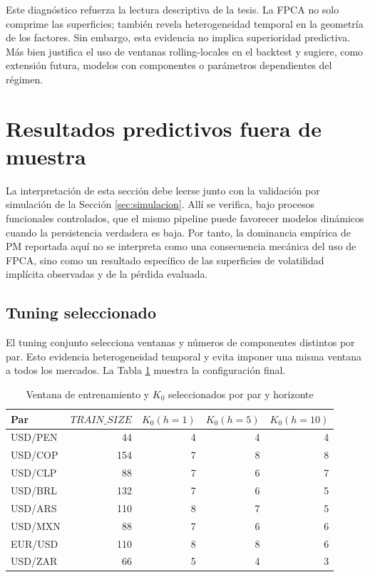\documentclass[a4paper,11pt]{article}
\newcommand{\SVIs}{superficies de volatilidad implícita}
\begin{document}
Este diagnóstico refuerza la lectura descriptiva de la tesis. La FPCA no solo comprime las superficies; también revela heterogeneidad temporal en la geometría de los factores. Sin embargo, esta evidencia no implica superioridad predictiva. Más bien justifica el uso de ventanas rolling-locales en el backtest y sugiere, como extensión futura, modelos con componentes o parámetros dependientes del régimen.

\section{Resultados predictivos fuera de muestra}

La interpretación de esta sección debe leerse junto con la validación por simulación de la Sección \ref{sec:simulacion}. Allí se verifica, bajo procesos funcionales controlados, que el mismo pipeline puede favorecer modelos dinámicos cuando la persistencia verdadera es baja. Por tanto, la dominancia empírica de PM reportada aquí no se interpreta como una consecuencia mecánica del uso de FPCA, sino como un resultado específico de las \SVIs{} observadas y de la pérdida evaluada.

\subsection{Tuning seleccionado}

El tuning conjunto selecciona ventanas y números de componentes distintos por par. Esto evidencia heterogeneidad temporal y evita imponer una misma ventana a todos los mercados. La Tabla \ref{tab:tuning} muestra la configuración final.

\begin{table}[H]
\centering
\caption{Ventana de entrenamiento y \(K_0\) seleccionados por par y horizonte}
\label{tab:tuning}
\small
\begin{tabular}{lrrrr}
\toprule
Par & \(TRAIN\_SIZE\) & \(K_0(h=1)\) & \(K_0(h=5)\) & \(K_0(h=10)\) \\
\midrule
USD/PEN & 44 & 4 & 4 & 4 \\
USD/COP & 154 & 7 & 8 & 8 \\
USD/CLP & 88 & 7 & 6 & 7 \\
USD/BRL & 132 & 7 & 6 & 5 \\
USD/ARS & 110 & 8 & 7 & 5 \\
USD/MXN & 88 & 7 & 6 & 6 \\
EUR/USD & 110 & 8 & 8 & 6 \\
USD/ZAR & 66 & 5 & 4 & 3 \\
\bottomrule
\end{tabular}
\end{table}
\end{document}
